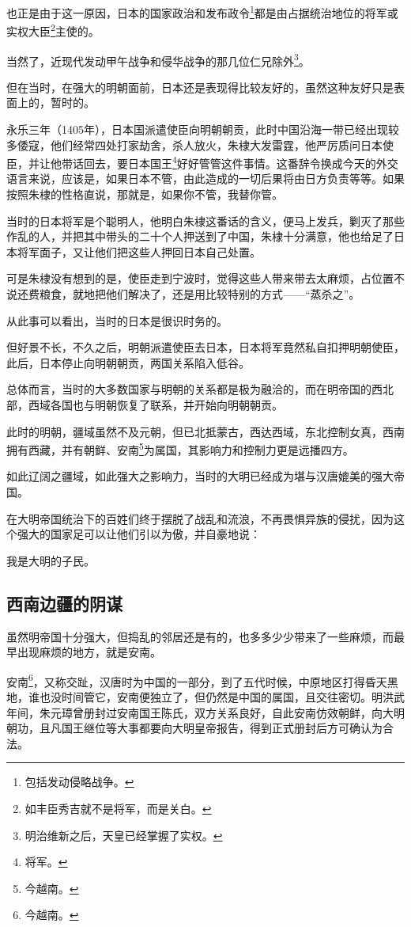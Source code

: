 \begin{multicols}{\theparacolNo}
也正是由于这一原因，日本的国家政治和发布政令\footnote{包括发动侵略战争。}都是由占据统治地位的将军或实权大臣\footnote{如丰臣秀吉就不是将军，而是关白。}主使的。

当然了，近现代发动甲午战争和侵华战争的那几位仁兄除外\footnote{明治维新之后，天皇已经掌握了实权。}。

但在当时，在强大的明朝面前，日本还是表现得比较友好的，虽然这种友好只是表面上的，暂时的。

永乐三年（1405年），日本国派遣使臣向明朝朝贡，此时中国沿海一带已经出现较多倭寇，他们经常四处打家劫舍，杀人放火，朱棣大发雷霆，他严厉质问日本使臣，并让他带话回去，要日本国王\footnote{将军。}好好管管这件事情。这番辞令换成今天的外交语言来说，应该是，如果日本不管，由此造成的一切后果将由日方负责等等。如果按照朱棣的性格直说，那就是，如果你不管，我替你管。

当时的日本将军是个聪明人，他明白朱棣这番话的含义，便马上发兵，剿灭了那些作乱的人，并把其中带头的二十个人押送到了中国，朱棣十分满意，他也给足了日本将军面子，又让他们把这些人押回日本自己处置。

可是朱棣没有想到的是，使臣走到宁波时，觉得这些人带来带去太麻烦，占位置不说还费粮食，就地把他们解决了，还是用比较特别的方式——“蒸杀之”。

从此事可以看出，当时的日本是很识时务的。

但好景不长，不久之后，明朝派遣使臣去日本，日本将军竟然私自扣押明朝使臣，此后，日本停止向明朝朝贡，两国关系陷入低谷。

总体而言，当时的大多数国家与明朝的关系都是极为融洽的，而在明帝国的西北部，西域各国也与明朝恢复了联系，并开始向明朝朝贡。

此时的明朝，疆域虽然不及元朝，但已北抵蒙古，西达西域，东北控制女真，西南拥有西藏，并有朝鲜、安南\footnote{今越南。}为属国，其影响力和控制力更是远播四方。

如此辽阔之疆域，如此强大之影响力，当时的大明已经成为堪与汉唐媲美的强大帝国。

在大明帝国统治下的百姓们终于摆脱了战乱和流浪，不再畏惧异族的侵扰，因为这个强大的国家足可以让他们引以为傲，并自豪地说：

我是大明的子民。

\subsection{西南边疆的阴谋}
虽然明帝国十分强大，但捣乱的邻居还是有的，也多多少少带来了一些麻烦，而最早出现麻烦的地方，就是安南。

安南\footnote{今越南。}，又称交趾，汉唐时为中国的一部分，到了五代时候，中原地区打得昏天黑地，谁也没时间管它，安南便独立了，但仍然是中国的属国，且交往密切。明洪武年间，朱元璋曾册封过安南国王陈氏，双方关系良好，自此安南仿效朝鲜，向大明朝功，且凡国王继位等大事都要向大明皇帝报告，得到正式册封后方可确认为合法。


\end{multicols}
